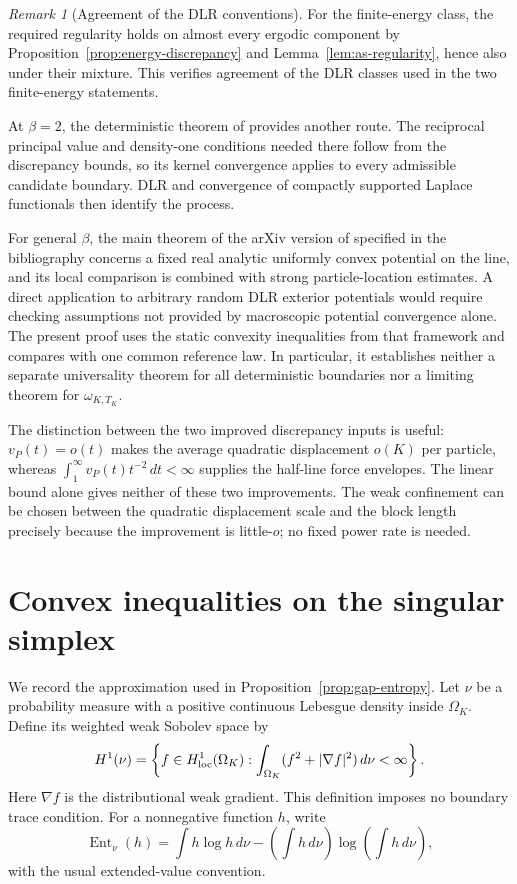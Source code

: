 \documentclass[11pt,reqno]{amsart}
\numberwithin{equation}{section}
\theoremstyle{definition}
\theoremstyle{remark}
\newtheorem{remark}[theorem]{Remark}
\newcommand{\1}{\mathbf 1}
\newcommand{\Ent}{\operatorname{Ent}}
\newcommand{\dd}{\,d}
\begin{document}
\begin{remark}[Agreement of the DLR conventions]
For the finite-energy class, the required regularity holds on almost
every ergodic component by Proposition~\ref{prop:energy-discrepancy}
and Lemma~\ref{lem:as-regularity}, hence also under their mixture.
This verifies agreement of the DLR classes used in the two
finite-energy statements.
\end{remark}

At $\beta=2$, the deterministic theorem of \cite[Theorem~1.3]{KMD}
provides another route. The reciprocal principal value and density-one
conditions needed there follow from the discrepancy bounds, so its
kernel convergence applies to every admissible candidate boundary.
DLR and convergence of compactly supported Laplace functionals then
identify the process.

For general $\beta$, the main theorem of the arXiv version of
\cite{BEY} specified in the bibliography concerns a fixed real analytic uniformly convex potential
on the line, and its local comparison is combined with strong
particle-location estimates. A direct application to arbitrary
random DLR exterior potentials would require checking assumptions not
provided by macroscopic potential convergence alone.
The present proof uses the static convexity inequalities from that
framework and compares with one common reference law. In particular,
it establishes neither a separate universality theorem for all
deterministic boundaries nor a limiting theorem for
$\omega_{K,T_K}$.

The distinction between the two improved discrepancy inputs is useful:
$v_P(t)=o(t)$ makes the average quadratic displacement $o(K)$ per
particle, whereas $\int_1^\infty v_P(t)t^{-2}\dd t<\infty$ supplies
the half-line force envelopes. The linear bound alone gives neither
of these two improvements. The weak confinement can be chosen between
the quadratic displacement scale and the block length precisely
because the improvement is little-$o$; no fixed power rate is needed.

\appendix
\section{Convex inequalities on the singular simplex}
\label{app:convex}

We record the approximation used in Proposition~\ref{prop:gap-entropy}.
Let $\nu$ be a probability measure with a positive continuous Lebesgue
density inside $\Omega_K$. Define its weighted weak Sobolev space by
\begin{equation}\label{eq:weighted-sobolev}
H^1(\nu)=\left\{f\in H^1_{\rm loc}(\Omega_K):
\int_{\Omega_K}(f^2+|\nabla f|^2)\dd\nu<\infty\right\}.
\end{equation}
Here $\nabla f$ is the distributional weak gradient.
This definition imposes no boundary trace condition.
For a nonnegative function $h$, write
\[
\Ent_\nu(h)=\int h\log h\dd\nu
 -\left(\int h\dd\nu\right)\log\left(\int h\dd\nu\right),
\]
with the usual extended-value convention.
\end{document}
